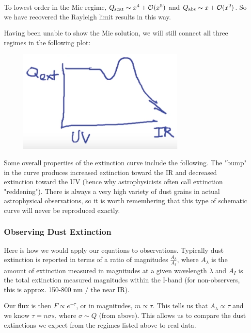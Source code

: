 \documentclass{article}
\begin{document}
\begin{itemize}
\begin{itemize}
        To lowest order in the Mie regime, $Q_{\rm{scat}} \sim x^{4} + \mathcal{O}(x^{5})$ and $Q_{\rm{abs}} \sim x + \mathcal{O}(x^{2})$. So we have recovered the Rayleigh limit results in this way. 

        Having been unable to show the Mie solution, we will still connect all three regimes in the following plot:
    \end{itemize}
\end{itemize}

\begin{figure}[ht]
    \centering
    \includegraphics[width=0.75\textwidth]{figures/Regimes.png}
    \label{fig:reg}
\end{figure}

Some overall properties of the extinction curve include the following. The "bump" in the curve produces increased extinction toward the IR and decreased extinction toward the UV (hence why astrophysicists often call extinction "reddening"). There is always a very high variety of dust grains in actual astrophysical observations, so it is worth remembering that this type of schematic curve will never be reproduced exactly. 

\subsubsection*{ Observing Dust Extinction}

Here is how we would apply our equations to observations. 
Typically dust extinction is reported in terms of a ratio of magnitudes $\frac{A_{\lambda}}{A_{I}}$, where $A_{\lambda}$ is the amount of extinction measured in magnitudes at a given wavelength $\lambda$ and $A_{I}$ is the total extinction measured magnitudes within the I-band (for non-observers, this is approx. 150-800 nm / the near IR). 

Our flux is then $F \propto e^{-\tau}$, or in magnitudes, $m \propto \tau$. 
This tells us that $A_{\lambda} \propto \tau$ and we know $\tau = n \sigma s$, where $\sigma \sim Q$ (from above). This allows us to compare the dust extinctions we expect from the regimes listed above to real data.
\end{document}
